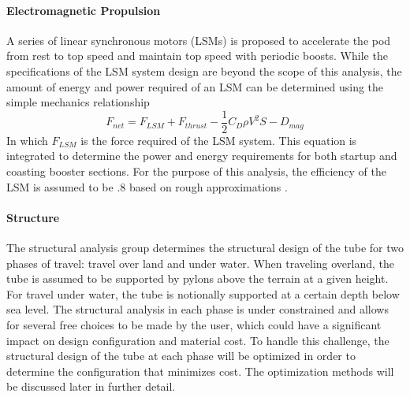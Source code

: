 \paragraph{Electromagnetic Propulsion}
	A series of linear synchronous motors (LSMs) is proposed to accelerate the
	pod from rest to top speed and maintain top speed with periodic boosts.
	While the specifications of the LSM system design are beyond the scope of
	this analysis, the amount of energy and power required of an LSM can be
	determined using the simple mechanics relationship
	\begin{equation}
		\label{eq:sum_of_forces}
		F_{net} = F_{LSM} + F_{thrust} - \frac{1}{2}C_{D}\rho V^{2}S - D_{mag}
	\end{equation}
	In which $F_{LSM}$ is the force required of the LSM system. This equation
	is integrated to determine the power and energy requirements for both
	startup and coasting booster sections. For the purpose of this analysis,
	the efficiency of the LSM is assumed to be .8 based on rough approximations \cite{LSM}.
\paragraph{Structure}
	The structural analysis group determines the structural design of the tube
	for two phases of travel: travel over land and under water. When traveling
	overland, the tube is assumed to be supported by pylons above the terrain
	at a given height. For travel under water, the tube is notionally
	supported at a certain depth below sea level. The structural analysis in
	each phase is under constrained and allows for several free choices to be
	made by the user, which could have a significant impact on design
	configuration and material cost. To handle this challenge, the structural
	design of the tube at each phase will be optimized in order to determine
	the configuration that minimizes cost. The optimization methods will be
	discussed later in further detail.

